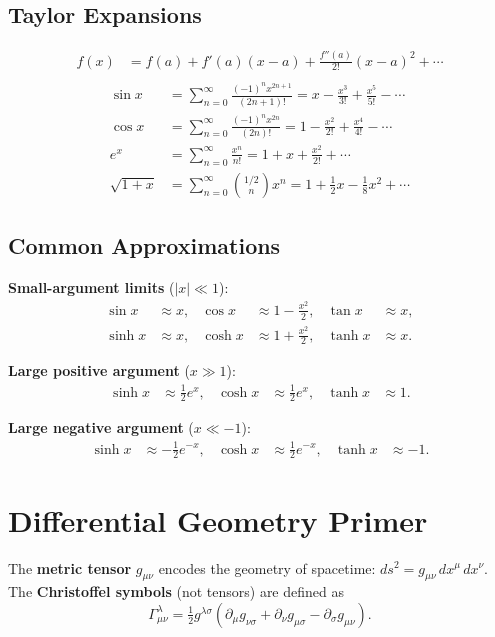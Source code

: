 \clearpage
\subsection*{Taylor Expansions}
\begin{align*}
      f(x) &= f(a) + f'(a)(x-a) + \tfrac{f''(a)}{2!}(x-a)^2 + \cdots\\
\end{align*}
\begin{align*}
      \sin x &= \sum_{n=0}^\infty \frac{(-1)^n x^{2n+1}}{(2n+1)!} = x - \tfrac{x^3}{3!} + \tfrac{x^5}{5!} - \cdots\\
      \cos x &= \sum_{n=0}^\infty \frac{(-1)^n x^{2n}}{(2n)!} = 1 - \tfrac{x^2}{2!} + \tfrac{x^4}{4!} - \cdots \\
      e^x &= \sum_{n=0}^\infty \frac{x^n}{n!} = 1 + x + \tfrac{x^2}{2!} + \cdots \\
      \sqrt{1+x} &= \sum_{n=0}^\infty \binom{1/2}{n} x^n = 1 + \tfrac{1}{2}x - \tfrac{1}{8}x^2 + \cdots
\end{align*}

\subsection*{Common Approximations}
\textbf{Small-argument limits} ($|x|\ll 1$):
\begin{align*}
      \sin x &\approx x, &
      \cos x &\approx 1 - \frac{x^2}{2}, &
      \tan x &\approx x,\\
      \sinh x &\approx x, &
      \cosh x &\approx 1 + \frac{x^2}{2}, &
      \tanh x &\approx x.
\end{align*}

\textbf{Large positive argument} ($x\gg 1$):
\begin{align*}
      \sinh x &\approx \frac{1}{2}e^x, &
      \cosh x &\approx \frac{1}{2}e^x, &
      \tanh x &\approx 1.
\end{align*}

\textbf{Large negative argument} ($x\ll -1$):
\begin{align*}
      \sinh x &\approx -\frac{1}{2}e^{-x}, &
      \cosh x &\approx \frac{1}{2}e^{-x}, &
      \tanh x &\approx -1.
\end{align*}

\clearpage
\section{Differential Geometry Primer}

The \textbf{metric tensor} $g_{\mu\nu}$ encodes the geometry of spacetime:
$ds^2 = g_{\mu\nu}\,dx^\mu\,dx^\nu$.
The \textbf{Christoffel symbols} (not tensors) are defined as
\begin{equation}
  \Gamma^\lambda_{\mu\nu} = \tfrac{1}{2}g^{\lambda\sigma}
    (\partial_\mu g_{\nu\sigma} + \partial_\nu g_{\mu\sigma} - \partial_\sigma g_{\mu\nu}).
\end{equation} \\

